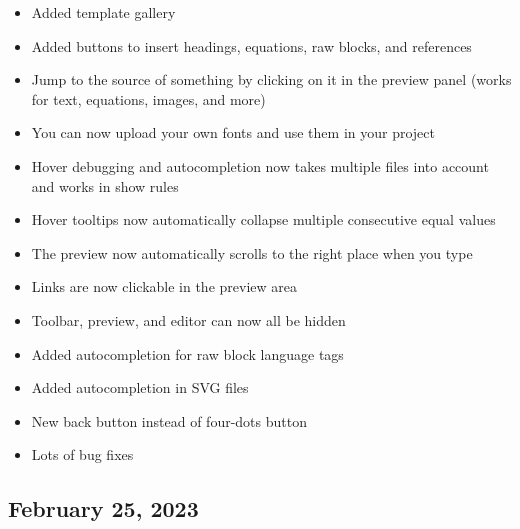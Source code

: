 \begin{itemize}
  \begin{itemize}
  \tightlist
  \item
    Added template gallery
  \item
    Added buttons to insert headings, equations, raw blocks, and
    references
  \item
    Jump to the source of something by clicking on it in the preview
    panel (works for text, equations, images, and more)
  \item
    You can now upload your own fonts and use them in your project
  \item
    Hover debugging and autocompletion now takes multiple files into
    account and works in show rules
  \item
    Hover tooltips now automatically collapse multiple consecutive equal
    values
  \item
    The preview now automatically scrolls to the right place when you
    type
  \item
    Links are now clickable in the preview area
  \item
    Toolbar, preview, and editor can now all be hidden
  \item
    Added autocompletion for raw block language tags
  \item
    Added autocompletion in SVG files
  \item
    New back button instead of four-dots button
  \item
    Lots of bug fixes
  \end{itemize}
\end{itemize}

\subsection{February 25, 2023}\label{february-25-2023}


